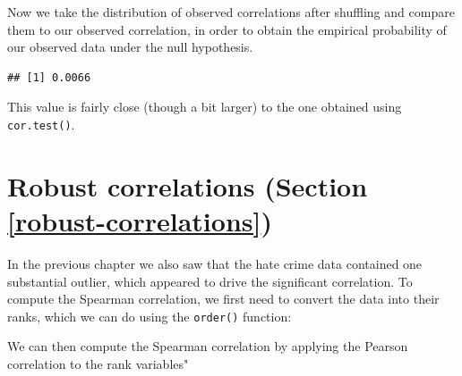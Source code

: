 \documentclass[12pt,]{book}
\newenvironment{Shaded}{\begin{snugshade}}{\end{snugshade}}
\newcommand{\DataTypeTok}[1]{\textcolor[rgb]{0.13,0.29,0.53}{#1}}
\newcommand{\KeywordTok}[1]{\textcolor[rgb]{0.13,0.29,0.53}{\textbf{#1}}}
\newcommand{\NormalTok}[1]{#1}
\newcommand{\OperatorTok}[1]{\textcolor[rgb]{0.81,0.36,0.00}{\textbf{#1}}}
\newcommand{\StringTok}[1]{\textcolor[rgb]{0.31,0.60,0.02}{#1}}
\begin{document}
Now we take the distribution of observed correlations after shuffling and compare them to our observed correlation, in order to obtain the empirical probability of our observed data under the null hypothesis.

\begin{Shaded}
\end{Shaded}

\begin{verbatim}
## [1] 0.0066
\end{verbatim}

This value is fairly close (though a bit larger) to the one obtained using \texttt{cor.test()}.

\hypertarget{robust-correlations-section-refrobust-correlations}{%
\section{Robust correlations (Section \ref{robust-correlations})}\label{robust-correlations-section-refrobust-correlations}}

In the previous chapter we also saw that the hate crime data contained one substantial outlier, which appeared to drive the significant correlation. To compute the Spearman correlation, we first need to convert the data into their ranks, which we can do using the \texttt{order()} function:

\begin{Shaded}
\end{Shaded}

We can then compute the Spearman correlation by applying the Pearson correlation to the rank variables"

\begin{Shaded}
\end{Shaded}
\end{document}
